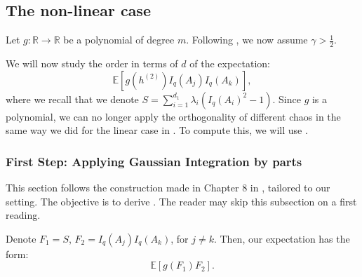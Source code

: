 \documentclass[]{article}
\numberwithin{equation}{section}
\theoremstyle{definition}
\newcommand{\RR}{\mathbb{R}}
\newcommand{\EE}{\mathbb{E}}
\begin{document}
\subsection{The non-linear case}
\label{lemma:non_linear_part_expectations}

Let $g:\RR \to \RR$ be a polynomial of degree $m$. Following , we now assume $\gamma > \frac{1}{2}$. 

We will now study the order in terms of $d$ of the expectation: 
\begin{equation}
    \EE \left [ g(h^{(2)}) I_{q}(A_j) I_{q}(A_k)\right ],
\end{equation}
where we recall that we denote $S = \sum_{i=1}^{d_1}\lambda_i (I_{q}(A_i)^{2}-1)$. Since $g$ is a polynomial, we can no longer apply the orthogonality of different chaos in the same way we did for the linear case in . To compute this, we will use . 

\subsubsection{First Step: Applying Gaussian Integration by parts} 
\label{section:int_by_parts}
This section follows the construction made in Chapter 8 in \cite{nourdin2012normal}, tailored to our setting. The objective is to derive . The reader may skip this subsection on a first reading. 

Denote $F_1 = S$, $F_{2} = I_{q}(A_j)I_{q}(A_k)$, for $j \not =k$. Then, our expectation has the form: 
\begin{equation}
    \EE\left[ g(F_{1}) F_{2}\right ].
\end{equation}
\end{document}
